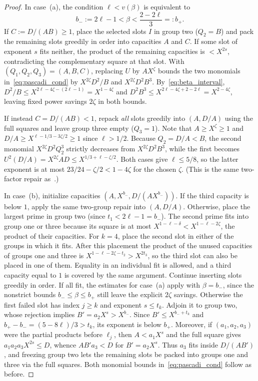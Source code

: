 \documentclass[11pt,reqno]{amsart}
\theoremstyle{remark}
\numberwithin{equation}{section}
\begin{document}
\begin{proof}
In case~(a), the condition $\ell < v(\beta)$ is equivalent to
\begin{equation}\label{eq:beta_interval}
b_- := 2\ell - 1 < \beta < \frac{2 - 2\ell}{3} =: b_+.
\end{equation}
If $C := D/(AB) \ge 1$, place the selected slots $I$ in group two ($Q_2 = B$) and pack the remaining slots greedily in order into capacities $A$ and $C$. If some slot of exponent $s$ fits neither, the product of the remaining capacities is $< X^{2s}$, contradicting the complementary square at that slot. With $(Q_1,Q_2,Q_3) = (A,B,C)$, replacing $U$ by $A X^\zeta$ bounds the two monomials in~\eqref{eq:pascadi_cond} by $X^{2\zeta} D^2/B$ and $X^{2\zeta} D^2 B^3$. By~\eqref{eq:beta_interval}, $D^2/B \le X^{2\ell - 4\zeta - (2\ell-1)} = X^{1-4\zeta}$ and $D^2 B^3 \le X^{2\ell - 4\zeta + 2 - 2\ell} = X^{2-4\zeta}$, leaving fixed power savings $2\zeta$ in both bounds.

If instead $C = D/(AB) < 1$, repack \emph{all} slots greedily into $(A, D/A)$ using the full squares and leave group three empty ($Q_3 = 1$). Note that $A \ge X^\zeta \ge 1$ and $D/A \ge X^{\ell - 1/3 - 3\zeta/2} \ge 1$ since $\ell > 1/2$. Because $Q_2 = D/A < B$, the second monomial $X^{2\zeta} D^2 Q_2^3$ strictly decreases from $X^{2\zeta} D^2 B^3$, while the first becomes $U^2 (D/A) = X^{2\zeta} A D \le X^{1/3 + \ell - \zeta/2}$. Both cases give $\ell\le 5/8$, so the latter exponent is at most $23/24-\zeta/2<1-4\zeta$ for the chosen $\zeta$. (This is the same two-factor repair as~\cite[Lemma~5.6]{Pascadi2025}.)

In case~(b), initialize capacities $(A, X^{b_-}, D/(AX^{b_-}))$. If the third capacity is below $1$, apply the same two-group repair into $(A, D/A)$. Otherwise, place the largest prime in group two (since $t_1 < 2\ell - 1 = b_-$). The second prime fits into group one or three because its square is at most $X^{1-\ell-\delta}<X^{1-\ell-2\zeta}$, the product of their capacities. For $k=4$, place the second slot in either of the groups in which it fits. After this placement the product of the unused capacities of groups one and three is $X^{1-\ell-2\zeta-t_2}>X^{2t_3}$, so the third slot can also be placed in one of them. Equality in an individual fit is allowed, and a third capacity equal to $1$ is covered by the same argument. Continue inserting slots greedily in order. If all fit, the estimates for case~(a) apply with $\beta=b_-$, since the nonstrict bounds $b_-\le\beta\le b_+$ still leave the explicit $2\zeta$ savings. Otherwise the first failed slot has index $j\ge k$ and exponent $s\le t_k$. Adjoin it to group two, whose rejection implies $B'=a_2X^s>X^{b_-}$. Since $B'\le X^{b_-+t_k}$ and $b_+-b_-=(5-8\ell)/3>t_k$, its exponent is below $b_+$. Moreover, if $(a_1,a_2,a_3)$ were the partial products before $\ell_j$, then $A < a_1 X^s$ and the full square gives $a_1 a_2 a_3 X^{2s} \le D$, whence $A B' a_3 < D$ for $B' = a_2 X^s$. Thus $a_3$ fits inside $D/(A B')$, and freezing group two lets the remaining slots be packed into groups one and three via the full squares. Both monomial bounds in~\eqref{eq:pascadi_cond} follow as before.
\end{proof}
\end{document}
